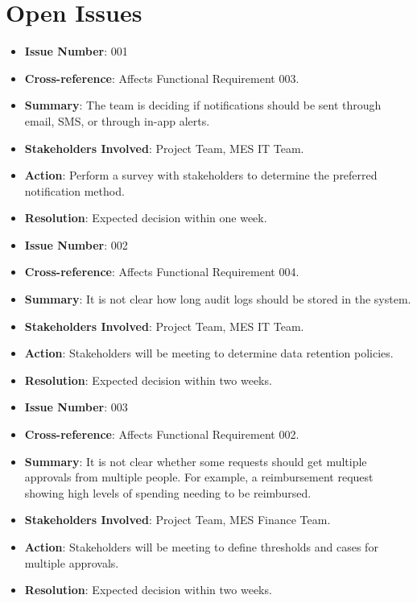 \documentclass[12pt]{article}
\begin{document}
\section{Open Issues}
\begin{itemize}
  \item \textbf{Issue Number}: 001
  \item \textbf{Cross-reference}: Affects Functional Requirement 003.
  \item \textbf{Summary}: The team is deciding if notifications should be sent through email, SMS, or through in-app alerts.
  \item \textbf{Stakeholders Involved}: Project Team, MES IT Team.
  \item \textbf{Action}: Perform a survey with stakeholders to determine the preferred notification method.
  \item \textbf{Resolution}: Expected decision within one week.

  \bigskip

  \item \textbf{Issue Number}: 002
  \item \textbf{Cross-reference}: Affects Functional Requirement 004.
  \item \textbf{Summary}: It is not clear how long audit logs should be stored in the system.
  \item \textbf{Stakeholders Involved}: Project Team, MES IT Team.
  \item \textbf{Action}: Stakeholders will be meeting to determine data retention policies. 
  \item \textbf{Resolution}: Expected decision within two weeks.

  \bigskip

  \item \textbf{Issue Number}: 003
  \item \textbf{Cross-reference}: Affects Functional Requirement 002.
  \item \textbf{Summary}: It is not clear whether some requests should get multiple approvals from multiple people. For example, a reimbursement request showing high levels of spending needing to be reimbursed.
  \item \textbf{Stakeholders Involved}: Project Team, MES Finance Team.
  \item \textbf{Action}: Stakeholders will be meeting to define thresholds and cases for multiple approvals.
  \item \textbf{Resolution}: Expected decision within two weeks.


\end{itemize}
\end{document}
